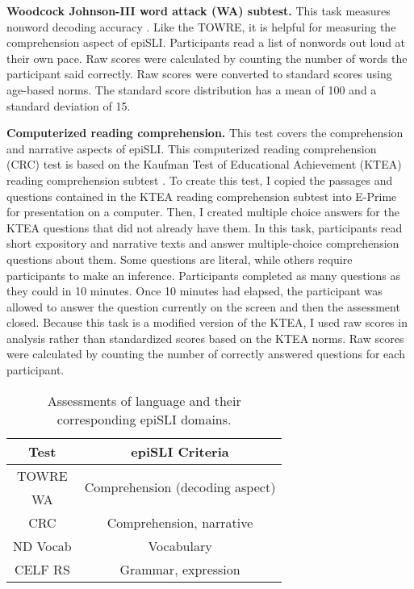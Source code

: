 \documentclass[../dissertation.tex]{subfiles}
\begin{document}
	\textbf{Woodcock Johnson-III word attack (WA) subtest.} This task measures nonword decoding accuracy \citep{Woodcock2001}. Like the TOWRE, it is helpful for measuring the comprehension aspect of epiSLI. Participants read a list of nonwords out loud at their own pace. Raw scores were calculated by counting the number of words the participant said correctly. Raw scores were converted to standard scores using age-based norms. The standard score distribution has a mean of 100 and a standard deviation of 15. \par
	\textbf{Computerized reading comprehension.} This test covers the comprehension and narrative aspects of epiSLI. This computerized reading comprehension (CRC) test is based on the Kaufman Test of Educational Achievement (KTEA) reading comprehension subtest \citep{Kaufman2004}. To create this test, I copied the passages and questions contained in the KTEA reading comprehension subtest into E-Prime \citep{schneider2002prime} for presentation on a computer. Then, I created multiple choice answers for the KTEA questions that did not already have them. In this task, participants read short expository and narrative texts and answer multiple-choice comprehension questions about them. Some questions are literal, while others require participants to make an inference. Participants completed as many questions as they could in 10 minutes. Once 10 minutes had elapsed, the participant was allowed to answer the question currently on the screen and then the assessment closed. Because this task is a modified version of the KTEA, I used raw scores in analysis rather than standardized scores based on the KTEA norms. Raw scores were calculated by counting the number of correctly answered questions for each participant.  \par
	
\begin{wraptable}[8]{R}{0.5\linewidth}
\caption{Assessments of language and their corresponding epiSLI domains.}
\vspace{-10pt}
\begin{center}
\begin{tabular}{ cc } 
 \toprule
 Test & epiSLI Criteria \\ 
 \midrule
 TOWRE & \multirow{2}{*}{Comprehension (decoding aspect)}\\ 
 WA & \\ 
 CRC & Comprehension, narrative \\
 ND Vocab & Vocabulary \\ 
 CELF RS & Grammar, expression \\ 
 \bottomrule 
\end{tabular}
\end{center}
\label{slitable}
\end{wraptable}
\end{document}
